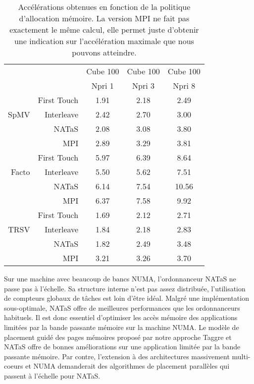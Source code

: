 \begin{table}[h!]
\begin{center}
  \begin{tabular}{|r|r|c|c|c|}
    \hline
       & & Cube 100 & Cube 100 & Cube 100 \\
       & & Npri 1   & Npri 3   & Npri 8 \\
    \hline
&        First Touch & 1.91 & 2.18 & 2.49 \\
SpMV &   Interleave  & 2.42 & 2.70 & 3.00 \\
&        NATaS       & 2.08 & 3.08 & 3.80 \\
&        MPI         & 2.89 & 3.29 & 3.81 \\
    \hline
&        First Touch & 5.97 & 6.39 & 8.64 \\
Facto &  Interleave  & 5.50 & 5.62 & 7.51 \\
&        NATaS       & 6.14 & 7.54 & 10.56 \\
&        MPI         & 6.37 & 7.58 & 9.92 \\
    \hline
&        First Touch & 1.69 & 2.12 & 2.71 \\
TRSV &   Interleave  & 1.84 & 2.18 & 2.83 \\
&        NATaS       & 1.82 & 2.49 & 3.48 \\
&        MPI         & 3.21 & 3.26 & 3.70 \\
    \hline
  \end{tabular}
  \caption{Accélérations obtenues en fonction de la politique d'allocation mémoire. La version MPI ne fait pas exactement le même calcul, elle permet juste d'obtenir une indication sur l'accélération maximale que nous pouvons atteindre.}
  \label{tab:rostand_sum}
\end{center}
\end{table}

Sur une machine avec beaucoup de bancs NUMA, l'ordonnanceur NATaS ne passe pas à l'échelle.
%
Sa structure interne n'est pas assez distribuée, l'utilisation de compteurs globaux de tâches est loin d'être idéal.
%
Malgré une implémentation sous-optimale, NATaS offre de meilleures performances que les ordonnanceurs habituels.
%
Il est donc essentiel d'optimiser les accès mémoire des applications limitées par la bande passante mémoire sur la machine NUMA.
%
Le modèle de placement guidé des pages mémoires proposé par notre approche Taggre et NATaS offre de bonnes améliorations sur une application limitée par la bande passante mémoire.
%
Par contre, l'extension à des architectures massivement multi-coeurs et NUMA demanderait des algorithmes de placement parallèles qui passent à l'échelle pour NATaS.
